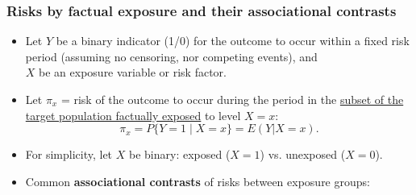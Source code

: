 \documentclass[12pt,dvipsnames,t,aspectratio=169, handout%
]{beamer}
\begin{document}
\begin{frame}
\frametitle{\large Risks by factual exposure and their associational contrasts}
 
\begin{itemize}
\item
Let %
 $Y$ %
 be a binary indicator (1/0)
for the outcome to occur within a fixed risk period (assuming no censoring, nor competing events), 
and \\ $X$ be an exposure variable or risk factor. 
\pause
\medskip
\item
Let $\pi_x$ = risk of the outcome to occur during the period in the
\underline{subset of the target population factually exposed} to level $X=x$:
$$ \pi_x = P \{ Y=1\mid X=x\} = E(Y|X=x) . $$
\pause
\item
For simplicity, let $X$ be binary: exposed ($X=1$) vs. unexposed ($X=0$). %
\pause
\medskip
\item
Common \textbf{associational contrasts}
of risks  between exposure groups:
\medskip
{}
\end{itemize}
\end{frame}
\end{document}
